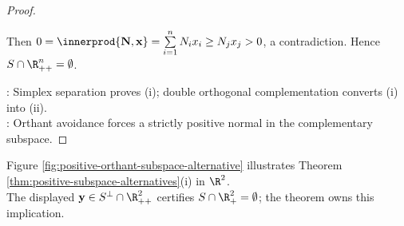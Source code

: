 \begin{theorem}
\begin{proof}
\begin{enumerate}[label=(\roman*)]
Then $0=\innerprod{\mathbf{N},\mathbf{x}}=\sum\limits_{i=1}^{n}N_ix_i\geq N_jx_j>0$, a contradiction. Hence $S\cap\R_{++}^n=\emptyset$.
\end{enumerate}
: Simplex separation proves (i); double orthogonal complementation converts (i) into (ii).\\
: Orthant avoidance forces a strictly positive normal in the complementary subspace.
\end{proof}
\end{theorem}

Figure \ref{fig:positive-orthant-subspace-alternative} illustrates Theorem \ref{thm:positive-subspace-alternatives}(i) in $\R^2$.\\
The displayed $\mathbf{y}\in S^\perp\cap\R_{++}^2$ certifies $S\cap\R_+^2=\emptyset$; the theorem owns this implication.

\begin{illustrationfigure}[H]
  \centering
  
  \caption{In $\R^2$, the negative-slope line $S$ avoids $\R_+^2$, while $\mathbf{y}\in S^\perp\cap\R_{++}^2$.}
  \label{fig:positive-orthant-subspace-alternative}
\end{illustrationfigure}

